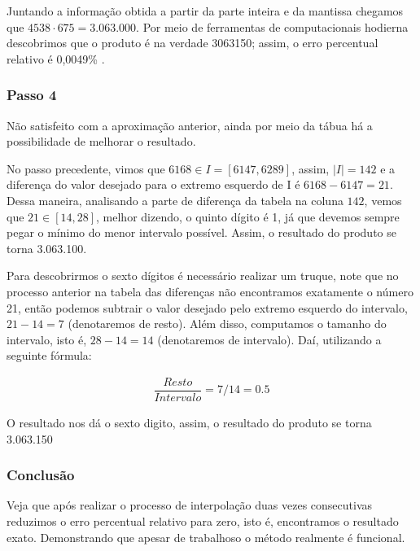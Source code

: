 Juntando a informação obtida a partir da parte inteira e da mantissa chegamos que $4538 \cdot 675 = 3.063.000$. Por meio de ferramentas de computacionais hodierna descobrimos que o produto é na verdade 3063150; assim, o erro percentual relativo é 0,0049\% .

\subsubsection{Passo 4}

Não satisfeito com a aproximação anterior, ainda por meio da tábua há a possibilidade de melhorar o resultado.

No passo precedente, vimos que $6168 \in I=[6147, 6289]$, assim, $|I| = 142$ e a diferença do valor desejado para o extremo esquerdo de I é $6168-6147 = 21$. Dessa maneira, analisando a parte de diferença da tabela na coluna $142$, vemos que $21 \in [14,28]$, melhor dizendo, o quinto dígito é 1, já que devemos sempre pegar o mínimo do menor intervalo possível. Assim, o resultado do produto se torna 3.063.100.

Para descobrirmos o sexto dígitos é necessário realizar um truque, note que no processo anterior na tabela das diferenças não encontramos exatamente o número 21, então podemos subtrair o valor desejado pelo extremo esquerdo do intervalo, $21-14 = 7$ (denotaremos de resto). Além disso, computamos o tamanho do intervalo, isto é, $28-14 = 14$ (denotaremos de intervalo). Daí, utilizando a seguinte fórmula:

\begin{align*}
    \dfrac{Resto}{Intervalo} = 7/14 = 0.5
\end{align*}

O resultado nos dá o sexto digito, assim, o resultado do produto se torna 3.063.150

\subsubsection{Conclusão}
Veja que após realizar o processo de interpolação duas vezes consecutivas reduzimos o erro percentual relativo para zero, isto é, encontramos o resultado exato. Demonstrando que apesar de trabalhoso o método realmente é funcional.